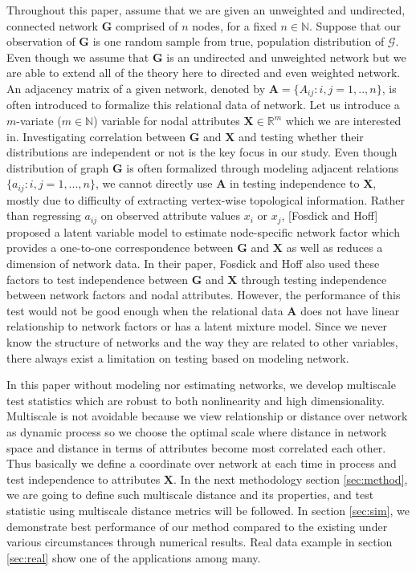 \documentclass[12pt]{article}
\theoremstyle{definition}
\begin{document}
 Throughout this paper, assume that we are given an unweighted and undirected, connected network $\boldsymbol{G}$ comprised of $n$ nodes, for a fixed $n \in \mathbb{N}$. Suppose that our observation of $\boldsymbol{G}$ is one random sample from true, population distribution of $\mathcal{G}$. Even though we assume that $\boldsymbol{G}$ is an undirected and unweighted network but we are able to extend all of the theory here to directed and even weighted network. An adjacency matrix of a given network, denoted by $\boldsymbol{A} = \{A_{ij} : i,j= 1,..,n \}$, is often introduced to formalize this relational data of network. Let us introduce a $m$-variate ($m \in \mathbb{N}$) variable for nodal attributes $\boldsymbol{X}  \in \mathbb{R}^{m}$ which we are interested in. Investigating correlation between $\boldsymbol{G}$ and $\boldsymbol{X}$ and testing whether their distributions are independent or not is the key focus in our study. 
 Even though distribution of graph $\boldsymbol{G}$ is often formalized through modeling adjacent relations $\{a_{ij} : i,j = 1,... , n \}$, we cannot directly use $\mathbf{A}$ in testing independence to $\mathbf{X}$, mostly due to difficulty of extracting vertex-wise topological information. Rather than regressing $a_{ij}$ on observed attribute values $x_{i}$ or $x_{j}$, [Fosdick and Hoff] proposed a latent variable model to estimate node-specific network factor which provides a one-to-one correspondence between $\boldsymbol{G}$ and $\boldsymbol{X}$ as well as reduces a dimension of network data. In their paper, Fosdick and Hoff also used these factors to test independence between $\boldsymbol{G}$ and $\boldsymbol{X}$ through testing independence between network factors and nodal attributes. However, the performance of this test would not be good enough when the relational data $\boldsymbol{A}$ does not have linear relationship to network factors or has a latent mixture model. Since we never know the structure of networks and the way they are related to other variables, there always exist a limitation on testing based on modeling network.
 
 In this paper without modeling nor estimating networks, we develop multiscale test statistics which are robust to both nonlinearity and high dimensionality. Multiscale is not avoidable because we view relationship or distance over network as dynamic process so we choose the optimal scale where distance in network space and distance in terms of attributes become most correlated each other. Thus basically we define a coordinate over network at each time in process and test independence to attributes $\mathbf{X}$. In the next methodology section \ref{sec:method}, we are going to define such multiscale distance and its properties, and test statistic using multiscale distance metrics will be followed. In section \ref{sec:sim}, we demonstrate best performance of our method compared to the existing under various circumstances through numerical results. Real data example in section \ref{sec:real} show one of the applications among many.  
 
\end{document}
